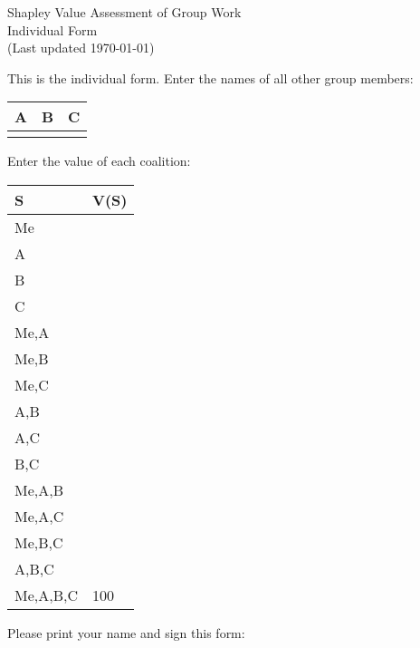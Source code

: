 \documentclass[12pt]{article}
\begin{document}
\begin{center}
\Large{Shapley Value Assessment of Group Work}\\
Individual Form\\
\tiny{(Last updated \today)}
\end{center}
This is the individual form. Enter the names of all other group members:
\vspace{1cm}

\begin{center}
\begin{tabular}{p{3cm}|p{3cm}|p{3cm}}
A&B&C\\
\hline
&&
\end{tabular}
\end{center}
\vspace{1cm}

Enter the value of each coalition:
\vspace{.5cm}

\begin{center}
\begin{tabular}{l|p{2cm}}
S&V(S)\\\hline
Me&\\\hline
A&\\\hline
B&\\\hline
C&\\\hline
Me,A&\\\hline
Me,B&\\\hline
Me,C&\\\hline
A,B&\\\hline
A,C&\\\hline
B,C&\\\hline
Me,A,B&\\\hline
Me,A,C&\\\hline
Me,B,C&\\\hline
A,B,C&\\\hline
Me,A,B,C&100\\\hline
\end{tabular}
\end{center}

\vspace{.5cm}
Please print your name and sign this form:
\end{document}
